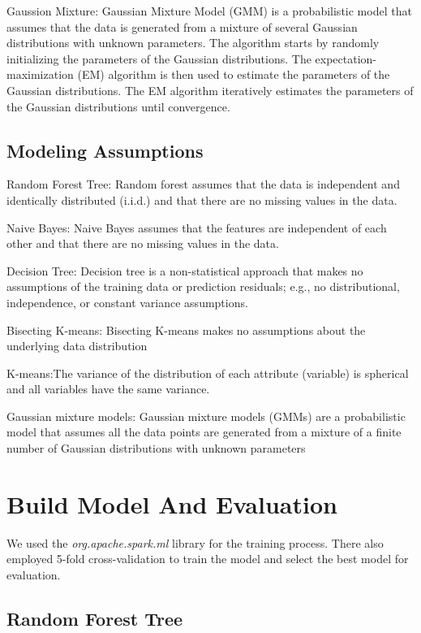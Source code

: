 Gaussion Mixture: Gaussian Mixture Model (GMM) is a probabilistic model that assumes that the data is generated from a mixture of several Gaussian distributions with unknown parameters. The algorithm starts by randomly initializing the parameters of the Gaussian distributions. The expectation-maximization (EM) algorithm is then used to estimate the parameters of the Gaussian distributions. The EM algorithm iteratively estimates the parameters of the Gaussian distributions until convergence. 

\subsection{Modeling Assumptions}
Random Forest Tree: Random forest assumes that the data is independent and identically distributed (i.i.d.) and that there are no missing values in the data.

Naive Bayes: Naive Bayes assumes that the features are independent of each other and that there are no missing values in the data.

Decision Tree: Decision tree is a non-statistical approach that makes no assumptions of the training data or prediction residuals; e.g., no distributional, independence, or constant variance assumptions.

Bisecting K-means: Bisecting K-means makes no assumptions about the underlying data distribution 

K-means:The variance of the distribution of each attribute (variable) is spherical and all variables have the same variance.

Gaussian mixture models: Gaussian mixture models (GMMs) are a probabilistic model that assumes all the data points are generated from a mixture of a finite number of Gaussian distributions with unknown parameters

\section{Build Model And Evaluation}  

We used the \textit{org.apache.spark.ml} library for the training process. There also employed 5-fold cross-validation to train the model and select the best model for evaluation.
\subsection{Random Forest Tree}

